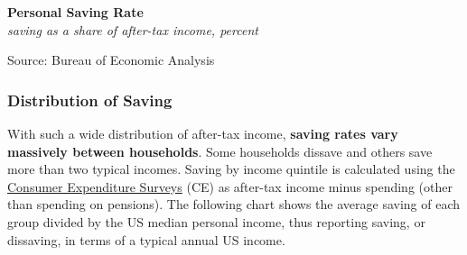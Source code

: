 \documentclass{report}
\makeatletter
\newcommand{\tbllink}[1]{\href{https://raw.githubusercontent.com/bdecon/US-chartbook/master/chartbook/data/#1}{\faTable}}
\newcommand*\short[1]{\expandafter\@gobbletwo\number\numexpr#1\relax}
\newcommand{\dateaxisticks}{
		date coordinates in=x, axis line style={draw=none},
		xmax={2023-11-01},
		max space between ticks=40,	    
		xtick={{1990-01-01}, {1992-01-01}, {1994-01-01}, 
			{1996-01-01}, {1998-01-01}, {2000-01-01}, 
			{2002-01-01}, {2004-01-01}, {2006-01-01},
			{2008-01-01}, {2010-01-01}, {2012-01-01}, {2014-01-01},
		    {2016-01-01}, {2018-01-01}, {2020-01-01}, {2022-01-01}, 
		    {2024-01-01}, {2026-01-01}},
		minor xtick={{1989-01-01}, {1991-01-01}, {1993-01-01},
			{1995-01-01}, {1997-01-01}, {1999-01-01}, 
			{2001-01-01}, {2003-01-01}, {2005-01-01}, {2007-01-01},
		    {2009-01-01}, {2011-01-01}, {2013-01-01}, {2015-01-01},
		    {2017-01-01}, {2019-01-01}, {2021-01-01}, {2023-01-01}, 
		    {2025-01-01}, {2027-01-01}},
		enlarge y limits={0.06}, enlarge x limits={0.01},
		}
\newcommand{\bbar}[2]{extra #1 ticks = {{#2}}, extra #1 tick labels = ,
		extra #1 tick style = {grid=major, grid style={thick, black!25}},}
\newcommand{\stdline}[4]{\addplot[very thick, no markers, color=#1] 
		table [x=#2, y=#3, col sep=comma] {#4};	}
\newcommand{\rbars}{
		\fill[color=black!10] (axis cs:{1990-07-01},\pgfkeysvalueof{/pgfplots/ymin}) rectangle 
			(axis cs:{1991-03-01}, \pgfkeysvalueof{/pgfplots/ymax});
		\fill[color=black!10] (axis cs:{2007-12-01},\pgfkeysvalueof{/pgfplots/ymin}) rectangle 
			(axis cs:{2009-07-01}, \pgfkeysvalueof{/pgfplots/ymax});
		\fill[color=black!10] (axis cs:{2001-03-01},\pgfkeysvalueof{/pgfplots/ymin}) rectangle 
			(axis cs:{2001-11-01}, \pgfkeysvalueof{/pgfplots/ymax});
		\fill[color=black!10] (axis cs:{2020-02-01},\pgfkeysvalueof{/pgfplots/ymin}) rectangle 
			(axis cs:{2020-05-01}, \pgfkeysvalueof{/pgfplots/ymax});}
\makeatother
\begin{document}
{\begin{minipage}{0.76\textwidth}

\vspace{1mm}

\normalsize \textbf{Personal Saving Rate}\\
\footnotesize{\textit{saving as a share of after-tax income, percent}}
\vspace{3.4cm}

\hspace{2mm} 

\footnotesize{Source: Bureau of Economic Analysis} \hfill \tbllink{psavert.csv}
\vspace{1mm}

\subsubsection*{Distribution of Saving}
\small With such a wide distribution of after-tax income, \textbf{saving rates vary massively between households}. Some households dissave and others save more than two typical incomes. Saving by income quintile is calculated using the \href{https://www.bls.gov/cex/}{Consumer Expenditure Surveys} (CE) as after-tax income minus spending (other than spending on pensions). The following chart shows the average saving of each group divided by the US median personal income, thus reporting saving, or dissaving, in terms of a typical annual US income. 
\vspace{1mm}


\end{minipage}}
\end{document}
